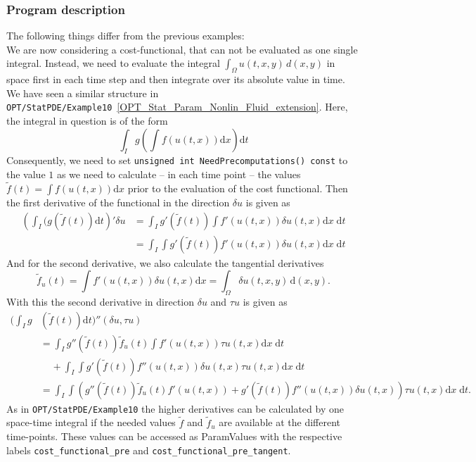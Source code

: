 \subsubsection{Program description}
The following things differ from the previous examples:\\[2mm]
We are now considering a cost-functional, that can not be evaluated as one single integral. Instead,
we need to evaluate the integral $\int_{\Omega} u(t,x,y) \,d(x,y)$ in space first in each time step and 
then integrate over its absolute value in time. We have seen a similar structure in 
\texttt{OPT/StatPDE/Example10}~\ref{OPT_Stat_Param_Nonlin_Fluid_extension}. Here, the integral 
in question is of the form
\[
\int_I g(\int f(u(t,x)) \mathrm{d}x) \mathrm{d}t
\]
Consequently, we need to set \texttt{unsigned int NeedPrecomputations() const} to the value $1$ 
as we need to calculate -- in each time point -- the values $\tilde{f}(t) = \int f(u(t,x)) \mathrm{d}x$ 
prior to the evaluation of the cost functional.
Then the first derivative of the functional in the direction $\delta u$ is given as 
\begin{align*}
   \left(\int_I(g\left(\tilde{f}(t)\right)\mathrm{d}t\right)'\delta u
  &= \int_I g'(\tilde{f}(t)) \int f'(u(t,x)) \delta u(t,x) \mathrm{d}x\;\mathrm{d}t \\
  &= \int_I \int g'(\tilde{f}(t)) f'(u(t,x)) \delta u(t,x) \mathrm{d}x\;\mathrm{d}t
\end{align*}
And for the second derivative, we also calculate the tangential derivatives 
\[
\tilde{f}_{u}(t) = \int f'(u(t,x)) \delta u(t,x) \mathrm{d}x = \int_{\Omega} \delta u(t,x,y) \,\mathrm{d}(x,y).
\]
With this the second derivative in direction $\delta u $ and $\tau u$ is given as 
\begin{align*}
   \Biggl(\int_Ig&\left(\tilde{f}(t)\right)\mathrm{d}t\Biggr)''(\delta u,\tau u)\\
  &= \int_I g''(\tilde{f}(t)) \tilde{f}_{u}(t) \int f'(u(t,x)) \tau u(t,x) \mathrm{d}x\;\mathrm{d}t \\
  &\;\;\;\;+ \int_I \int g'(\tilde{f}(t)) f''(u(t,x)) \delta u(t,x) \tau u(t,x) \mathrm{d}x\;\mathrm{d}t\\
&= \int_I \int \left( g''(\tilde{f}(t)) \tilde{f}_{u}(t)f'(u(t,x))+ g'(\tilde{f}(t)) f''(u(t,x)) \delta u(t,x) \right) \tau u(t,x) \mathrm{d}x\;\mathrm{d}t.
\end{align*}
As in \texttt{OPT/StatPDE/Example10} the higher derivatives can be calculated by one space-time 
integral if the needed values $\tilde{f}$ and $\tilde{f}_u$ are available at the 
different time-points. These values can be accessed as ParamValues with the respective 
labels \texttt{cost\_functional\_pre} and \texttt{cost\_functional\_pre\_tangent}.

